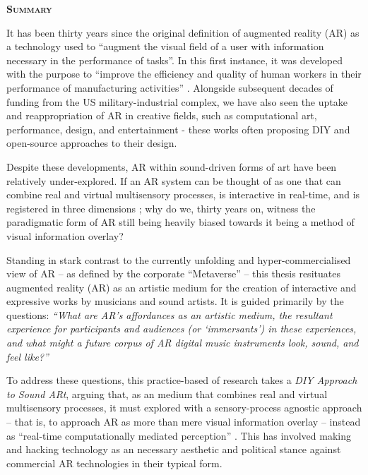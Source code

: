 
{\noindent\Huge\textsc{\textbf{Summary}} \par}
\noindent It has been thirty years since the original definition of augmented reality (AR) as a technology used to ``augment the visual field of a user with information necessary in the performance of tasks''. In this first instance, it was developed with the purpose to ``improve the efficiency and quality of human workers in their performance of manufacturing activities'' \citep{caudell1992}. Alongside subsequent decades of funding from the US military-industrial complex, we have also seen the uptake and reappropriation of AR in creative fields, such as computational art, performance, design, and entertainment - these works often proposing DIY and open-source approaches to their design. 

\noindent Despite these developments, AR within sound-driven forms of art have been relatively under-explored. If an AR system can be thought of as one that can combine real and virtual multisensory processes, is interactive in real-time, and is registered in three dimensions \citep{azuma1997}; why do we, thirty years on, witness the paradigmatic form of AR still being heavily biased \citep{billinghurst2015} towards it being a method of visual information overlay?

\noindent Standing in stark contrast to the currently unfolding and hyper-commercialised view of AR --  as defined by the corporate ``Metaverse'' --  this thesis resituates augmented reality (AR) as an artistic medium for the creation of interactive and expressive works by musicians and sound artists. It is guided primarily by the questions: \textit{``What are AR's affordances as an artistic medium, the resultant experience for participants and audiences (or `immersants') in these experiences, and what might a future corpus of AR digital music instruments look, sound, and feel like?''}

\noindent To address these questions, this practice-based of research takes a \textit{DIY Approach to Sound ARt}, arguing that, as an medium that combines real and virtual multisensory processes, it must explored with a sensory-process agnostic approach -- that is, to approach AR as more than mere visual information overlay -- instead as ``real-time computationally mediated perception'' \citep{chevalier2020}. This has involved making and hacking technology as an necessary aesthetic and political stance against commercial AR technologies in their typical form.

